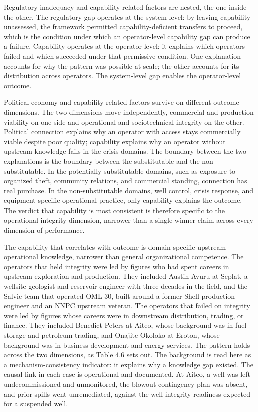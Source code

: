 Regulatory inadequacy and capability-related factors are nested, the one
inside the other. The regulatory gap operates at the system level: by
leaving capability unassessed, the framework permitted
capability-deficient transfers to proceed, which is the condition under
which an operator-level capability gap can produce a failure. Capability
operates at the operator level: it explains which operators failed and
which succeeded under that permissive condition. One explanation
accounts for why the pattern was possible at scale; the other accounts
for its distribution across operators. The system-level gap enables the
operator-level outcome.

Political economy and capability-related factors survive on different
outcome dimensions. The two dimensions move independently, commercial
and production viability on one side and operational and sociotechnical
integrity on the other. Political connection explains why an operator
with access stays commercially viable despite poor quality; capability
explains why an operator without upstream knowledge fails in the crisis
domains. The boundary between the two explanations is the boundary
between the substitutable and the non-substitutable. In the potentially
substitutable domains, such as exposure to organized theft, community
relations, and commercial standing, connection has real purchase. In the
non-substitutable domains, well control, crisis response, and
equipment-specific operational practice, only capability explains the
outcome. The verdict that capability is most consistent is therefore
specific to the operational-integrity dimension, narrower than a
single-winner claim across every dimension of performance.

The capability that correlates with outcome is domain-specific upstream
operational knowledge, narrower than general organizational competence.
The operators that held integrity were led by figures who had spent
careers in upstream exploration and production. They included Austin
Avuru at Seplat, a wellsite geologist and reservoir engineer with three
decades in the field, and the Salvic team that operated OML 30, built
around a former Shell production engineer and an NNPC upstream veteran.
The operators that failed on integrity were led by figures whose careers
were in downstream distribution, trading, or finance. They included
Benedict Peters at Aiteo, whose background was in fuel storage and
petroleum trading, and Onajite Okoloko at Eroton, whose background was
in business development and energy services. The pattern holds across
the two dimensions, as Table 4.6 sets out. The background is read here
as a mechanism-consistency indicator: it explains why a knowledge gap
existed. The causal link in each case is operational and documented. At
Aiteo, a well was left undecommissioned and unmonitored, the blowout
contingency plan was absent, and prior spills went unremediated, against
the well-integrity readiness expected for a suspended well.

